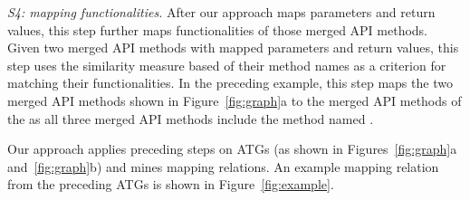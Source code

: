 \emph{S4: mapping functionalities.} After our approach maps parameters and return values,
this step further maps functionalities of those merged API
methods. Given two merged API methods with mapped parameters and return values,
this step uses the similarity measure based of their method names as a criterion
for matching their functionalities. In the preceding example, this step maps
the two merged API methods shown in Figure~\ref{fig:graph}a to the
merged API methods of the  as all three
merged API methods include the method named .

Our approach applies preceding steps on ATGs
(as shown in Figures~\ref{fig:graph}a and~\ref{fig:graph}b) and mines
mapping relations. An example mapping relation from the preceding ATGs is
shown in Figure~\ref{fig:example}.
